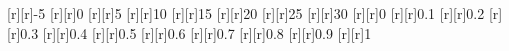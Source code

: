 \begin{psfrags}
[r][r]{-5}%
[r][r]{0}%
[r][r]{5}%
[r][r]{10}%
[r][r]{15}%
[r][r]{20}%
[r][r]{25}%
[r][r]{30}%
[r][r]{0}%
[r][r]{0.1}%
[r][r]{0.2}%
[r][r]{0.3}%
[r][r]{0.4}%
[r][r]{0.5}%
[r][r]{0.6}%
[r][r]{0.7}%
[r][r]{0.8}%
[r][r]{0.9}%
[r][r]{1}%
%
%
\end{psfrags}%
%
